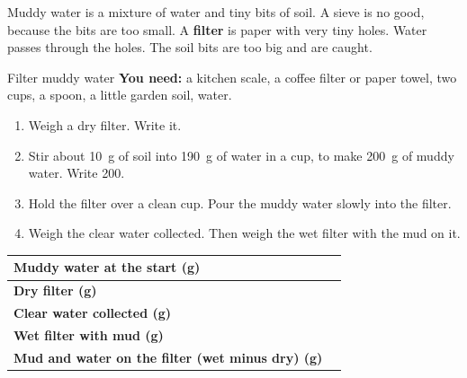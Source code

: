 \label{ch4}

Muddy water is a mixture of water and tiny bits of soil. A sieve is no good, because the bits are too small. A \textbf{filter} is paper with very tiny holes. Water passes through the holes. The soil bits are too big and are caught.

\begin{center}
\end{center}

\begin{tryit}{Filter muddy water}
\textbf{You need:} a kitchen scale, a coffee filter or paper towel, two cups, a spoon, a little garden soil, water.
\begin{enumerate}[leftmargin=1.6em]
\item Weigh a dry filter. Write it.
\item Stir about 10~g of soil into 190~g of water in a cup, to make 200~g of muddy water. Write 200.
\item Hold the filter over a clean cup. Pour the muddy water slowly into the filter.
\item Weigh the clear water collected. Then weigh the wet filter with the mud on it.
\end{enumerate}
\par\medskip
\renewcommand{\arraystretch}{1.6}
\begin{tabular}{|l|c|}
\hline
\textbf{Muddy water at the start (g)} & \\ \hline
\textbf{Dry filter (g)} & \\ \hline
\textbf{Clear water collected (g)} & \\ \hline
\textbf{Wet filter with mud (g)} & \\ \hline
\textbf{Mud and water on the filter (wet minus dry) (g)} & \\ \hline
\end{tabular}
\end{tryit}

